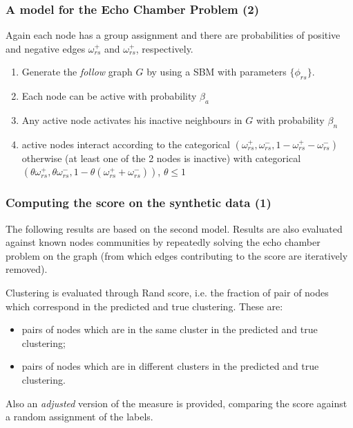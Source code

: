 \documentclass{beamer}
\begin{document}
\begin{frame}[c]
	\frametitle{A model for the Echo Chamber Problem (2)}
	Again each node has a group assignment and there are probabilities of
	positive and negative edges $\omega _{rs}^{+}  $ and $\omega _{rs}^{+}  $,
	respectively.

	\begin{enumerate}
		\item Generate the \emph{follow} graph $G$ by using a SBM with parameters
		      $\{ \phi _{rs}  \}$.
		\item Each node can be active with probability $\beta_{a}  $
		\item Any active node activates his inactive neighbours in $G$ with
		      probability $\beta_n$
		\item active nodes interact according to the categorical $(\omega _{rs}
			      ^{+}, \omega _{rs} ^{-}, 1 - \omega _{rs} ^{+} - \omega _{rs} ^{-})
		      $ otherwise (at least one of the 2 nodes is inactive) with
		      categorical $(\theta \omega _{rs} ^{+}, \theta \omega _{rs} ^{-}, 1
			      - \theta (\omega _{rs} ^{+} + \omega _{rs} ^{-}))$, $\theta \leq 1$
	\end{enumerate}

\end{frame}
\begin{frame}[c]
	\frametitle{Computing the score on the synthetic data (1)}
	The following results are based on the second model. Results are also
	evaluated against known nodes communities by repeatedly solving the echo
	chamber problem on the graph (from which edges contributing to the score
	are iteratively removed).

	\bigskip

	Clustering is evaluated through Rand score, i.e. the fraction of pair of
	nodes which correspond in the predicted and true clustering.
	These are:
	\begin{itemize}
		\item pairs of nodes which are in the same cluster in the predicted and
		      true clustering;
		\item pairs of nodes which are in different clusters in the predicted
		      and true clustering.
	\end{itemize}
	Also an \emph{adjusted} version of the measure is provided, comparing the
	score against a random assignment of the labels.

	\bigskip

\end{frame}
\end{document}
